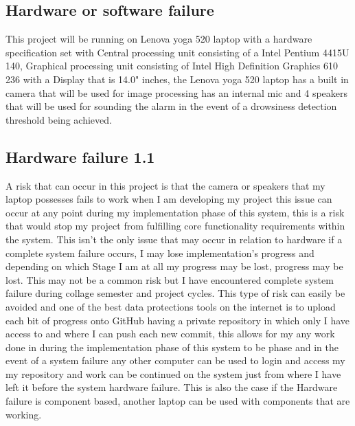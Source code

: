 \subsection{Hardware or software failure}
This project will be running on Lenova yoga 520 laptop with a hardware specification set with Central processing unit consisting of a Intel Pentium 4415U 140,  Graphical processing unit consisting of Intel High Definition Graphics 610 236 with a Display that is  14.0" inches, the
Lenova yoga 520 laptop has a built in camera that will be used for image processing has an internal mic and 4 speakers that will be used for sounding the alarm in the event of a drowsiness detection threshold being achieved.
\subsection{Hardware failure 1.1}
A risk that can occur in this project is that the camera or speakers that my laptop possesses fails to work when I am developing my project this issue can occur at any point during my implementation phase of this system, this is a risk that would stop my project from fulfilling  core functionality requirements within the system. This isn't the only issue that may occur in relation to hardware if a complete system failure occurs, I may lose implementation's progress and depending on which Stage I am at all my progress may be lost, progress may be lost. This may not be a common risk but I have encountered complete system failure during collage semester and project cycles. This type of risk can easily be avoided and one of the best data protections tools on the internet is to upload each bit of progress onto GitHub having a private repository in which only I have access to and where I can push each new commit, this allows for my any work done in during the implementation phase of this system to be phase and in the event of a system failure any other computer can be used to login and access my my repository and work can be continued on the system just from where I have left it before the system hardware failure. This is also the case if the Hardware failure is component based, another laptop can be used with components that are working.

